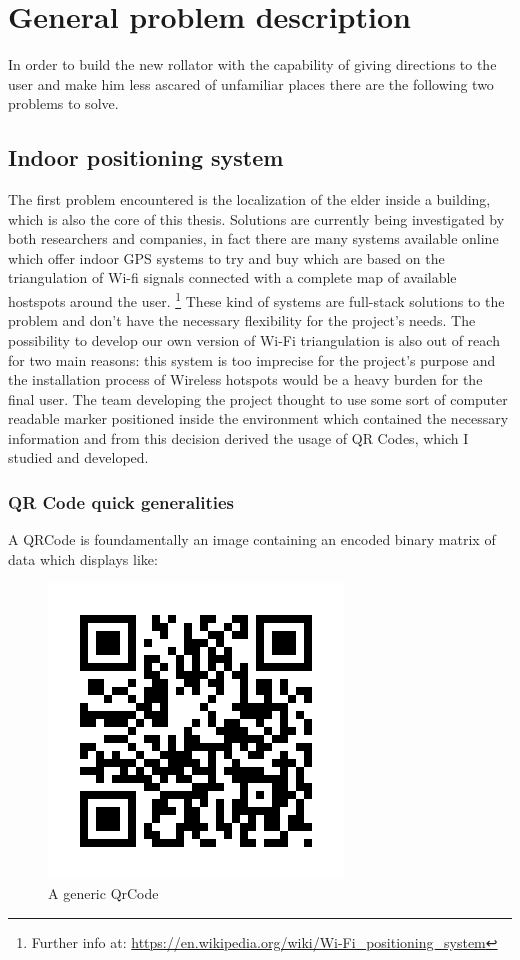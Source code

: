 \chapter{General problem description}

\vspace{6cm}
In order to build the new rollator with the capability of giving directions to
the user and make him less ascared of unfamiliar places there are the following
two problems to solve.
\newpage

\section{Indoor positioning system}
The first problem encountered is the localization of the elder inside a
building, which is also the core of this thesis.
Solutions are currently being investigated by both researchers and companies, in fact there are many systems available online which offer indoor 
GPS systems to try and buy which are based on the triangulation of Wi-fi signals connected with a
complete map of available hostspots around the user.
\footnote{Further info at: 
\url{https://en.wikipedia.org/wiki/Wi-Fi_positioning_system}}
These kind of systems are full-stack solutions to the problem and don't have the
necessary flexibility for the project's needs.
The possibility to develop our own version of Wi-Fi triangulation is also out of reach for two main reasons:
this system is too imprecise for the project's purpose and the installation process of Wireless hotspots would be a heavy burden for the final user.
\newline
The team developing the project thought to use some sort of computer readable 
marker positioned inside the environment which contained the necessary information
and from this decision derived the usage of QR Codes, which I studied and
developed.

\subsection{QR Code quick generalities}
A QRCode is foundamentally an image containing an encoded binary matrix of data which displays like:
\begin{figure}[hbt]
    \centering
    \caption{A generic QrCode}
    \includegraphics[scale=0.5]{img/qr.png}
\end{figure}

